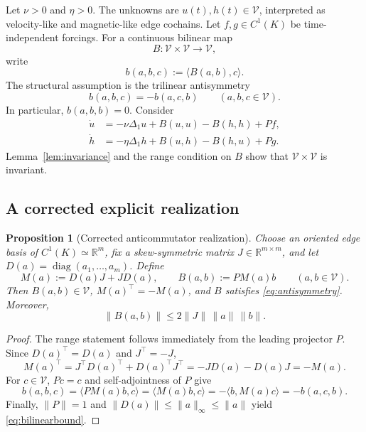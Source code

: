 \documentclass[11pt]{article}
\newtheorem{proposition}{Proposition}
\theoremstyle{remark}
\begin{document}
Let $\nu>0$ and $\eta>0$. The unknowns are $u(t),h(t)\in\mathcal V$, interpreted as velocity-like and magnetic-like edge cochains. Let $f,g\in C^1(K)$ be time-independent forcings. For a continuous bilinear map
\[
B:\mathcal V\times\mathcal V\longrightarrow\mathcal V,
\]
write
\[
b(a,b,c):=\langle B(a,b),c\rangle.
\]
The structural assumption is the trilinear antisymmetry
\begin{equation}
b(a,b,c)=-b(a,c,b)
\qquad(a,b,c\in\mathcal V).
\label{eq:antisymmetry}
\end{equation}
In particular, $b(a,b,b)=0$. Consider
\begin{align}
\dot u&=-\nu\Delta_1u+B(u,u)-B(h,h)+Pf,\label{eq:u}\\
\dot h&=-\eta\Delta_1h+B(u,h)-B(h,u)+Pg.\label{eq:h}
\end{align}
Lemma~\ref{lem:invariance} and the range condition on $B$ show that $\mathcal V\times\mathcal V$ is invariant.

\subsection{A corrected explicit realization}

\begin{proposition}[Corrected anticommutator realization]\label{prop:toy}
Choose an oriented edge basis of $C^1(K)\simeq\mathbb R^m$, fix a skew-symmetric matrix $J\in\mathbb R^{m\times m}$, and let $D(a)=\operatorname{diag}(a_1,\ldots,a_m)$. Define
\begin{equation}
M(a):=D(a)J+JD(a),
\qquad
B(a,b):=PM(a)b
\qquad(a,b\in\mathcal V).
\label{eq:anticommutator}
\end{equation}
Then $B(a,b)\in\mathcal V$, $M(a)^\top=-M(a)$, and $B$ satisfies \eqref{eq:antisymmetry}. Moreover,
\begin{equation}
\|B(a,b)\|\leq2\|J\|\,\|a\|\,\|b\|.
\label{eq:bilinearbound}
\end{equation}
\end{proposition}

\begin{proof}
The range statement follows immediately from the leading projector $P$. Since $D(a)^\top=D(a)$ and $J^\top=-J$,
\[
M(a)^\top=J^\top D(a)^\top+D(a)^\top J^\top=-JD(a)-D(a)J=-M(a).
\]
For $c\in\mathcal V$, $Pc=c$ and self-adjointness of $P$ give
\[
b(a,b,c)=\langle PM(a)b,c\rangle
=\langle M(a)b,c\rangle
=-\langle b,M(a)c\rangle
=-b(a,c,b).
\]
Finally, $\|P\|=1$ and $\|D(a)\|\leq\|a\|_\infty\leq\|a\|$ yield \eqref{eq:bilinearbound}.
\end{proof}
\end{document}
